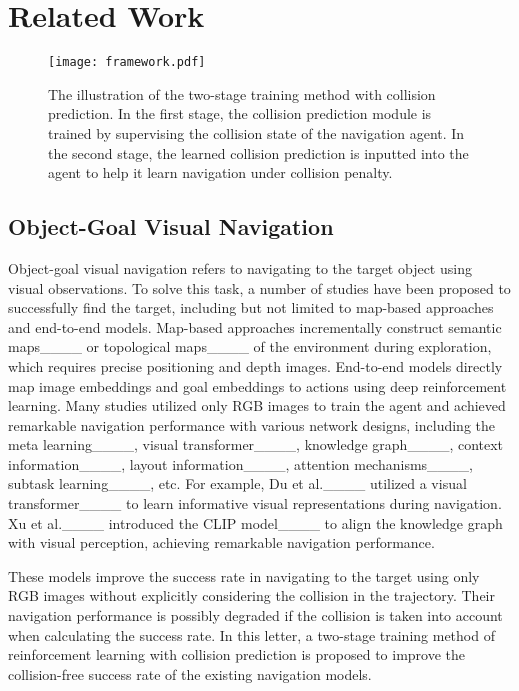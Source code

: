 \section{Related Work}
\begin{figure*}[t]
\centerline{\texttt{[image: framework.pdf]}}
\caption{The illustration of the two-stage training method with collision prediction. In the first stage, the collision prediction module is trained by supervising the collision state of the navigation agent. In the second stage, the learned collision prediction is inputted into the agent to help it learn navigation under collision penalty.}
\label{fw}
\end{figure*}

\subsection{Object-Goal Visual Navigation}

Object-goal visual navigation refers to navigating to the target object using visual observations. To solve this task, a number of studies have been proposed to successfully find the target, including but not limited to map-based approaches and end-to-end models. Map-based approaches incrementally construct semantic maps____ or topological maps____ of the environment during exploration, which requires precise positioning and depth images. End-to-end models directly map image embeddings and goal embeddings to actions using deep reinforcement learning. Many studies utilized only RGB images to train the agent and achieved remarkable navigation performance with various network designs, including the meta learning____, visual transformer____, knowledge graph____, context information____, layout information____, attention mechanisms____, subtask learning____, etc. For example, Du et al.____ utilized a visual transformer____ to learn informative visual representations during navigation. Xu et al.____ introduced the CLIP model____ to align the knowledge graph with visual perception, achieving remarkable navigation performance.

These models improve the success rate in navigating to the target using only RGB images without explicitly considering the collision in the trajectory. Their navigation performance is possibly degraded if the collision is taken into account when calculating the success rate. In this letter, a two-stage training method of reinforcement learning with collision prediction is proposed to improve the collision-free success rate of the existing navigation models. 

